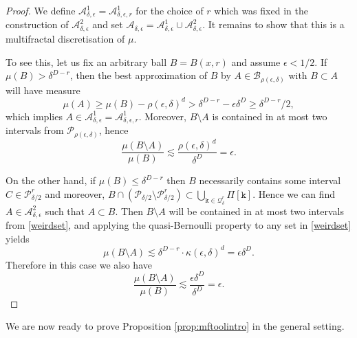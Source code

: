 \documentclass[11pt, reqno]{amsart}
\numberwithin{equation}{section}
\theoremstyle{plain}%
\theoremstyle{definition}
\def\A{\ensuremath{\mathscr A}}
\renewcommand{\k}{\mathtt{k}}
\renewcommand{\A}{\mathcal{A}}
\theoremstyle{nonumberplain}
\begin{document}
\begin{proof}
We define $\A^1_{\delta,\epsilon}=\A^1_{\delta,\epsilon,r}$ for the choice of $r$ which was fixed in the construction of $\A^2_{\delta,\epsilon}$ and set $\A_{\delta,\epsilon}=\A^1_{\delta,\epsilon} \cup \A^2_{\delta,\epsilon}$. It remains to show that this is a multifractal discretisation of $\mu$.

To see this, let us fix an arbitrary ball $B=B(x,r)$ and assume $\epsilon<1/2$. If $\mu(B)>\delta^{D-r}$, then the best approximation of $B$ by $A \in \mathcal{B}_{\rho(\epsilon,\delta)}$ with $B \subset A$ will have measure
$$\mu(A) \geq \mu(B)-\rho(\epsilon,\delta)^{d}>\delta^{D-r}-\epsilon \delta^{D} \ge \delta^{D-r}/2,$$ which implies $A \in \A^1_{\delta,\epsilon}=\A^1_{\delta,\epsilon,r}$. Moreover, $B \setminus A$ is contained in at most two intervals from $\mathscr{P}_{\rho(\epsilon,\delta)}$, hence
$$\frac{\mu(B \setminus A)}{\mu(B)} \lesssim\frac{\rho(\epsilon,\delta)^{d}}{\delta^{D}}=\epsilon.$$

On the other hand, if $\mu(B)\leq\delta^{D-r}$ then $B$ necessarily contains some interval $C \in \mathscr{P}_{\delta/2}^r$ and moreover, $B \cap(\mathscr{P}_{\delta/2}\setminus \mathscr{P}_{\delta/2}^r) \subset \bigcup_{\k \in\mathcal{Q}_\delta^r} \Pi[\k]$. Hence we can find $A \in  \A^2_{\delta,\epsilon}$ such that $A \subset B$. Then $B \setminus A$ will be contained in at most two intervals from \eqref{weirdset}, and applying the quasi-Bernoulli property to any set in \eqref{weirdset} yields 
$$\mu(B \setminus A) \lesssim \delta^{D-r} \cdot \kappa(\epsilon,\delta)^{d}=\epsilon\delta^{D}.$$
Therefore in this case we also have
$$\frac{\mu(B \setminus A)}{\mu(B)} \lesssim\frac{\epsilon\delta^{D}}{\delta^{D}}=\epsilon.$$

\end{proof}

We are now ready to prove Proposition \ref{prop:mftoolintro} in the general setting.
\end{document}
